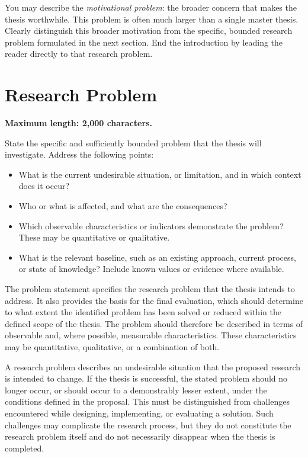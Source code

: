 \documentclass[runningheads]{llncs}
\begin{document}
You may describe the \emph{motivational problem}: the broader concern that
makes the thesis worthwhile. This problem is often much larger than a single
master thesis. Clearly distinguish this broader motivation from the specific, bounded research problem formulated in the next section. End the
introduction by leading the reader directly to that research problem.

\section{Research Problem}
\textbf{Maximum length: 2,000 characters.}

State the specific and sufficiently bounded problem that the thesis will
investigate. Address the following points:
\begin{itemize}
  \item What is the current undesirable situation, or limitation, and in which context does it occur?
  \item Who or what is affected, and what are the consequences?
  \item Which observable characteristics or indicators demonstrate the
        problem? These may be quantitative or qualitative.
  \item What is the relevant baseline, such as an existing approach, current
        process, or state of knowledge? Include known values or evidence where
        available.
\end{itemize}

The problem statement specifies the research problem that the thesis intends to address. It also provides the basis for the final evaluation, which should determine to what extent the identified problem has been solved or reduced within the defined scope of the thesis. The problem should therefore be described in terms of observable and, where possible, measurable characteristics. These characteristics may be quantitative, qualitative, or a combination of both.

A research problem describes an undesirable situation that the proposed research is intended to change. If the thesis is successful, the stated problem should no longer occur, or should occur to a demonstrably lesser extent, under the conditions defined in the proposal. This must be distinguished from challenges encountered while designing, implementing, or evaluating a solution. Such challenges may complicate the research process, but they do not constitute the research problem itself and do not necessarily disappear when the thesis is completed.
\end{document}
